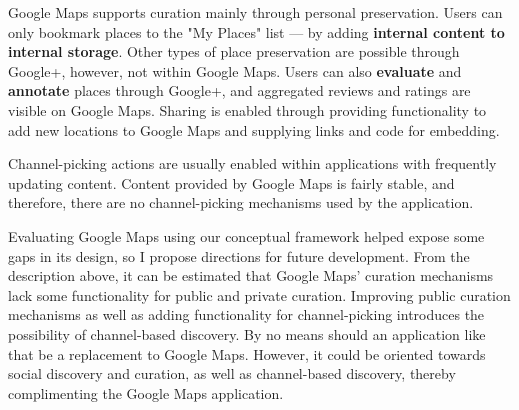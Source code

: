 {Google Maps supports curation mainly through personal preservation. Users can only bookmark places to the "My Places" list --- by adding \textbf{internal content to internal storage}. Other types of place preservation are possible through Google+, however, not within Google Maps. Users can also \textbf{evaluate} and \textbf{annotate} places through Google+, and aggregated reviews and ratings are visible on Google Maps. Sharing is enabled through providing functionality to add new locations to Google Maps and supplying links and code for embedding.  

Channel-picking actions are usually enabled within applications with frequently updating content. Content provided by Google Maps is fairly stable, and therefore, there are no channel-picking mechanisms used by the application.

Evaluating Google Maps using our conceptual framework helped expose some gaps in its design, so I propose directions for future development. From the description above, it can be estimated that Google Maps' curation mechanisms lack some functionality for public and private curation. Improving public curation mechanisms as well as adding functionality for channel-picking introduces the possibility of channel-based discovery. By no means should an application like that be a replacement to Google Maps. However, it could be oriented towards social discovery and curation, as well as channel-based discovery, thereby complimenting the Google Maps application.  

} %

